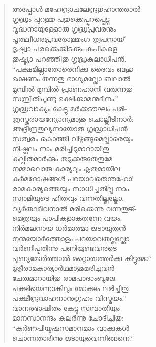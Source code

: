 \begin{verse}
അപ്പോള്‍ മഹേന്ദ്രാചലേന്ദ്രഗുഹാന്തരാല്‍\\
ഗൃദ്ധ്രം പുറത്തു പതുക്കെപ്പുറപ്പെട്ടു\\
വൃദ്ധനായുള്ളോരു ഗൃദ്ധ്രപ്രവരനും\\
പൃത്ഥ്വീധരപ്രവരോത്തുംഗ രൂപനായ്\\
ദൃഷ്ട്വാ പരക്കെക്കിടക്കും കപികളെ\\
തുഷ്ട്യാ പറഞ്ഞിതു ഗൃദ്ധ്രകുലാധിപന്‍.\\
“പക്ഷമില്ലാതോരെനിക്കു ദൈവം ബഹു-\\
ഭക്ഷണം തന്നതു ഭാഗ്യമല്ലോ ബലാല്‍\\
മുമ്പില്‍ മുമ്പില്‍ പ്രാണഹാനി വരുന്നതു\\
സമ്പ്രീതിപൂണ്ടു ഭക്ഷിക്കാമനുദിനം.”\\
ഗൃദ്ധ്രവാക്യം കേട്ടു മര്‍ക്കടൗഘം പരി-\\
ത്രസ്തരായന്യോന്യമാശു ചൊല്ലീടിനാര്‍:\\
അദ്രീന്ദ്രതുല്യനായോരു ഗൃദ്ധ്രാധിപന്‍\\
സത്വരം കൊത്തി വിഴുങ്ങുമെല്ലാരെയും\\
നിഷ്ഫലം നാം മരിച്ചീടുമാറായിതു\\
കല്പിതമാര്‍ക്കും തടുക്കരുതേതുമേ.\\
നമ്മാലൊരു കാര്യവും കൃതമായീല\\
കര്‍മദോഷങ്ങള്‍ പറയാവതെന്തഹോ!\\
രാമകാര്യത്തെയും സാധിച്ചതില്ല നാം\\
സ്വാമിയുടെ ഹിതവും വന്നതില്ലല്ലോ.\\
വ്യര്‍ത്ഥമിവനാല്‍ മരിക്കെന്നു വന്നതുജ്-\\
മെത്രയും പാപികളാകതന്നേ വയം.\\
നിര്‍മലനായ ധര്‍മാത്മാ ജടായുതന്‍\\
നന്മയോര്‍ത്തോളം പറയാവതല്ലല്ലോ\\
വര്‍ണിപ്പതിന്നു പണിയുണ്ടവനുടെ\\
പുണ്യമോര്‍ത്താല്‍ മറ്റൊരുത്തര്‍ക്കു കിട്ടുമോ?\\
ശ്രീരാമകാര്യാര്‍ഥമാശുമരിച്ചവന്‍\\
ചേരുമാറായിതു രാമപാദാംബുജേ.\\
പക്ഷിയെന്നാകിലും മോക്ഷം ലഭിച്ചിതു\\
പക്ഷീന്ദ്രവാഹനാനുഗ്രഹം വിസ്മയം.”\\
വാനരഭാഷിതം കേട്ടു സമ്പാതിയും\\
മാനസാനന്ദം കലര്‍ന്നു ചോദിച്ചിതു:\\
“കര്‍ണപീയൂഷസമാനമാം വാക്കുകള്‍\\
ചൊന്നതാരിന്നു ജടായുവെന്നിങ്ങനെ?\\

\end{verse}
